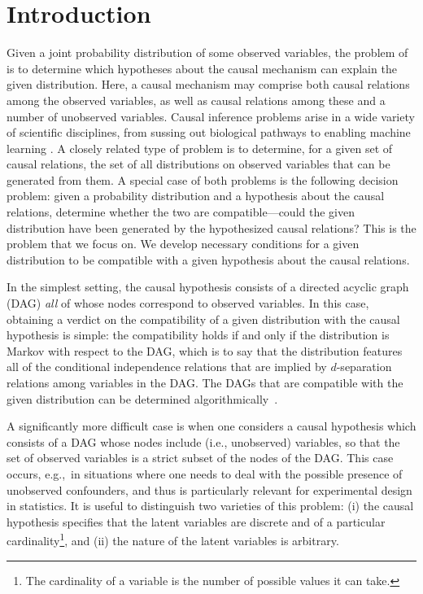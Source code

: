 \documentclass[aps,english,superscriptaddress,onecolumn,twoside,longbibliography,pra,floatfix,fleqn,nofootinbib]{revtex4-1}%
\newcommand*{\tblue}[1]{{\color{MidnightBlue}{\textbf{#1}}}}
\theoremstyle{definition}
\begin{document}
\maketitle
\tableofcontents

\section{Introduction}

Given a joint probability distribution of some observed variables, the problem of \tblue{causal inference} is to determine which hypotheses about the causal mechanism can explain the given distribution. Here, a causal mechanism may comprise both causal relations among the observed variables, as well as causal relations among these and a number of unobserved variables.
 Causal inference problems arise in a wide variety of scientific disciplines, from sussing out biological pathways to enabling machine learning \cite{pearl2009causality,spirtes2011causation,studeny2005probabilistic,koller2009probabilistic}. A closely related type of problem is to determine, for a given set of causal relations, the set of all distributions on observed variables that can be generated from them.   
A special case of both problems is the following decision problem: given a probability distribution and a hypothesis about the causal relations, determine whether the two are compatible---could the given distribution have been generated by the hypothesized causal relations? This is the problem that we focus on.
We develop necessary conditions for a given distribution to be compatible with a given hypothesis about the causal relations.

In the simplest setting, the causal hypothesis consists of a directed acyclic graph (DAG) {\em all} of whose nodes correspond to observed variables. In this case, obtaining a verdict on the compatibility of a given distribution with the causal hypothesis is simple: the compatibility holds if and only if the distribution is Markov with respect to the DAG, which is to say that the distribution features all of the conditional independence relations that are implied by $d$-separation relations among variables in the DAG. 
The DAGs that are compatible with the given distribution can be determined algorithmically~\cite{pearl2009causality}.

A significantly more difficult case is when one considers a causal hypothesis which consists of a DAG whose nodes include \tblue{latent} (i.e., unobserved) variables, so that the set of observed variables is a strict subset of the nodes of the DAG. This case occurs, e.g.,~in situations where one needs to deal with the possible presence of unobserved confounders, and thus is particularly relevant for experimental design in statistics. It is useful to distinguish two varieties of this problem: (i) the causal hypothesis specifies that the latent variables are discrete and of a particular cardinality\footnote{The cardinality of a variable is the number of possible values it can take.}, and (ii) the nature of the latent variables is arbitrary.  
\end{document}
